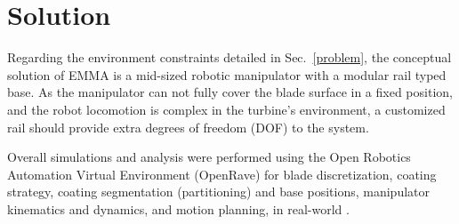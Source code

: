 \section{Solution}


Regarding the environment constraints detailed in Sec.~\ref{problem}, the
conceptual solution of EMMA is a mid-sized robotic manipulator with a modular
rail typed base. As the manipulator can not fully cover the blade surface in a
fixed position, and the robot locomotion is complex in the turbine's
environment, a customized rail should provide extra degrees of freedom (DOF) to
the system.

Overall simulations and analysis were performed using the Open Robotics
Automation Virtual Environment (OpenRave) for blade discretization, coating
strategy, coating segmentation (partitioning) and base positions, manipulator
kinematics and dynamics, and motion planning, in real-world
\cite{diankov2008openrave}. 

\begin{comment}
Several concepts for robotic base were
simulated and the simpler solution in constructive terms was chosen,
consisting of a Prismatic-Rotational-Prismatic-Prismatic (PRPP) base.



The coating solution used in industry today is to oversize the robot
in means of its reach, such that one fixed and large base is enough to do all 
the process without moving the robot's base. 
This is feasible because there are no constraints regarding to its size and no
other objects but the blade in an optimal position, in a specially designed room.

Because of the small access to the interior of the turbine and the narrow space
between the blades, this solution requires a midsize to small robot. 
These manipulators cannot reach all the surface of the blade without moving its
base, so an external base need to provide degrees of freedom (DOF) that allow
the manipulator to reach all the surface.
A geometric and kinematic study was made to find the required positions of the
robot's base that allow the complete coverage of the blade.
From this, were studied several base concepts regarding to the DOF and joints of
the base. The simpler solution in constructive terms was chosen, and consists of
a Prismatic-Rotational-Prismatic-Prismatic (PRPP) joints.
\end{comment}


